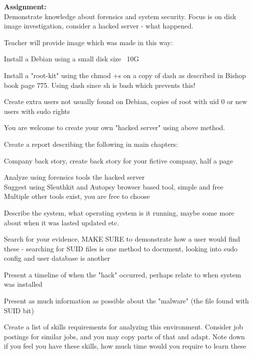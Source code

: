 \documentclass[a4paper,11pt,notitlepage,landscape]{report}
\begin{document}
{}


\normal


{\bf Assignment:}\\
Demonstrate knowledge about forensics and system security. Focus is on disk image investigation, consider a hacked server - what happened.

Teacher will provide image which was made in this way:
\begin{list2}
\item Install a Debian using a small disk size ~10G
\item Install a "root-kit" using the chmod +s on a copy of dash as described in Bishop book page 775. Using dash since sh is bash which prevents this!
\item Create extra users not usually found on Debian, copies of root with uid 0 or new users with sudo rights
\end{list2}

You are welcome to create your own "hacked server" using above method.

Create a report describing the following in main chapters:

\begin{list2}
\item Company back story, create back story for your fictive company, half a page
\item Analyze using forensics tools the hacked server\\
Suggest using Sleuthkit and Autopsy browser based tool, simple and free\\
Multiple other tools exist, you are free to choose
\item Describe the system, what operating system is it running, maybe some more about when it was lasted updated etc.
\item Search for your evidence, MAKE SURE to demonstrate how a user would find these - searching for SUID files is one method to document, looking into sudo config and user database is another
\item Present a timeline of when the "hack" occurred, perhaps relate to when system was installed
\item Present as much information as possible about the "malware" (the file found with SUID bit)
\item Create a list of skills requirements for analyzing this environment. Consider job postings for similar jobs, and you may copy parts of that and adapt. Note down if you feel you have these skills, how much time would you require to learn these
\end{list2}
\end{document}
